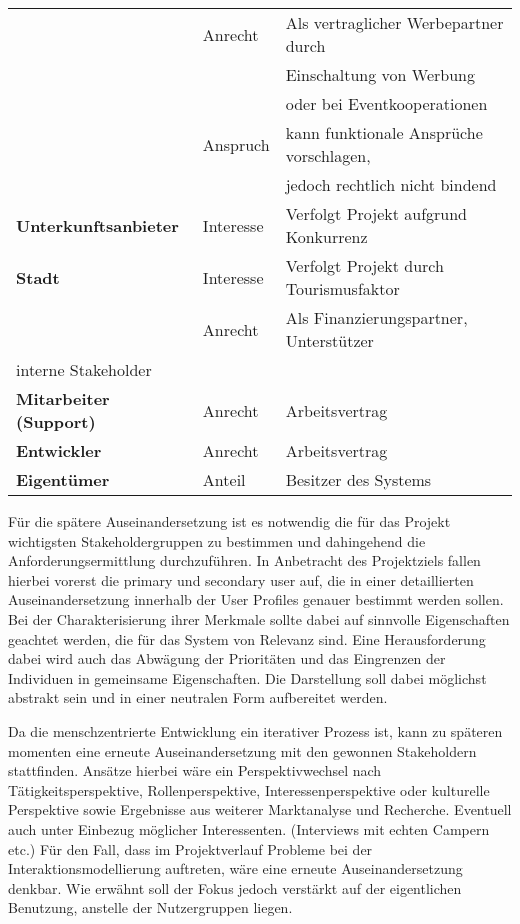 \begin{table}[H]
\begin{tabular}{l l l}
                     & Anrecht & Als vertraglicher Werbepartner durch \\[0.5ex]
                              & & Einschaltung von Werbung \\[0.5ex]
                              & & oder bei Eventkooperationen\\[1ex]
                      & Anspruch  & kann funktionale Ansprüche vorschlagen, \\[1ex]
                              & & jedoch rechtlich nicht bindend\\[1ex]


\textbf{Unterkunftsanbieter} & Interesse & Verfolgt Projekt aufgrund Konkurrenz \\[1ex]

\textbf{Stadt} & Interesse & Verfolgt Projekt durch Tourismusfaktor \\[1ex]
 & Anrecht & Als Finanzierungspartner, Unterstützer \\[1ex]

interne Stakeholder & &\\[1ex]
\textbf{Mitarbeiter (Support)} & Anrecht & Arbeitsvertrag \\[1ex]

\textbf{Entwickler} & Anrecht & Arbeitsvertrag \\[1ex]
\textbf{Eigentümer} & Anteil & Besitzer des Systems \\[1ex]

\hline
\end{tabular}
\label{tab:stakeholderidentifikation}
\end{table}


Für die spätere Auseinandersetzung ist es notwendig die für das Projekt wichtigsten Stakeholdergruppen zu bestimmen und dahingehend die Anforderungsermittlung durchzuführen.
In Anbetracht des Projektziels fallen hierbei vorerst die primary und secondary user auf, die in einer detaillierten Auseinandersetzung innerhalb der User Profiles genauer bestimmt werden sollen.
Bei der Charakterisierung ihrer Merkmale sollte dabei auf sinnvolle Eigenschaften geachtet werden, die für das System von Relevanz sind. Eine Herausforderung dabei wird auch das Abwägung der Prioritäten und das Eingrenzen der Individuen in gemeinsame Eigenschaften. Die Darstellung soll dabei möglichst abstrakt sein und in einer neutralen Form aufbereitet werden.
 
Da die menschzentrierte Entwicklung ein iterativer Prozess ist, kann zu späteren momenten eine erneute Auseinandersetzung mit den gewonnen Stakeholdern stattfinden.
Ansätze hierbei wäre ein Perspektivwechsel nach Tätigkeitsperspektive, Rollenperspektive, Interessenperspektive oder kulturelle Perspektive sowie Ergebnisse aus weiterer Marktanalyse und Recherche. Eventuell auch unter Einbezug möglicher Interessenten. (Interviews mit echten Campern etc.) Für den Fall, dass im Projektverlauf Probleme bei der Interaktionsmodellierung auftreten, wäre eine erneute Auseinandersetzung denkbar. Wie erwähnt soll der Fokus  jedoch verstärkt auf der eigentlichen Benutzung, anstelle der Nutzergruppen liegen.\\
 



